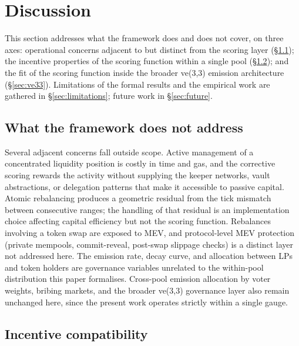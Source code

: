 \documentclass[11pt,a4paper]{article}
\theoremstyle{definition}
\theoremstyle{plain}
\theoremstyle{remark}
\begin{document}
\section{Discussion}\label{sec:discussion}

This section addresses what the framework does and does not cover, on three axes: operational concerns adjacent to but distinct from the scoring layer (\S\ref{sec:outofscope}); the incentive properties of the scoring function within a single pool (\S\ref{sec:incentive}); and the fit of the scoring function inside the broader ve(3,3) emission architecture (\S\ref{sec:ve33}). Limitations of the formal results and the empirical work are gathered in \S\ref{sec:limitations}; future work in \S\ref{sec:future}.

\subsection{What the framework does not address}\label{sec:outofscope}

Several adjacent concerns fall outside scope. Active management of a concentrated liquidity position is costly in time and gas, and the corrective scoring rewards the activity without supplying the keeper networks, vault abstractions, or delegation patterns that make it accessible to passive capital. Atomic rebalancing produces a geometric residual from the tick mismatch between consecutive ranges\cite{ryan2026a}; the handling of that residual is an implementation choice affecting capital efficiency but not the scoring function. Rebalances involving a token swap are exposed to MEV, and protocol-level MEV protection (private mempools, commit-reveal, post-swap slippage checks) is a distinct layer not addressed here. The emission rate, decay curve, and allocation between LPs and token holders are governance variables unrelated to the within-pool distribution this paper formalises. Cross-pool emission allocation by voter weights, bribing markets, and the broader ve(3,3) governance layer also remain unchanged here, since the present work operates strictly within a single gauge.

\subsection{Incentive compatibility}\label{sec:incentive}
\end{document}
